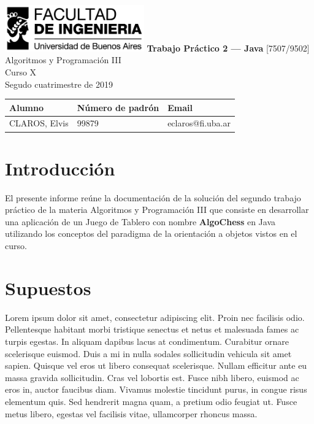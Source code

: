 \documentclass[titlepage,a4paper]{article}
\begin{document}
\begin{titlepage} %
	\hfill\includegraphics[width=6cm]{logofiuba.jpg}
    \centering
    \vfill
    \Huge \textbf{Trabajo Práctico 2 — Java}
    \vskip2cm
    \Large [7507/9502] Algoritmos y Programación III\\
    Curso X \\ %
    Segudo cuatrimestre de 2019 
    \vfill
    \begin{tabular}{ | l | l | l | } %
      \hline \hline
      Alumno & Número de padrón & Email\\ \hline \hline
      CLAROS, Elvis & 99879 & eclaros@fi.uba.ar\\ \hline
    
  	\end{tabular}
    \vfill
    \vfill
\end{titlepage}

\tableofcontents %
\newpage

\section{Introducción}\label{sec:intro}
El presente informe reúne la documentación de la solución del segundo trabajo práctico de la materia Algoritmos y Programación III que consiste en desarrollar una aplicación de un Juego de Tablero con nombre \textbf{AlgoChess} en Java utilizando los conceptos del paradigma de la orientación a objetos vistos en el curso.

\section{Supuestos}\label{sec:supuestos}

Lorem ipsum dolor sit amet, consectetur adipiscing elit. Proin nec facilisis odio. Pellentesque habitant morbi tristique senectus et netus et malesuada fames ac turpis egestas. In aliquam dapibus lacus at condimentum. Curabitur ornare scelerisque euismod. Duis a mi in nulla sodales sollicitudin vehicula sit amet sapien. Quisque vel eros ut libero consequat scelerisque. Nullam efficitur ante eu massa gravida sollicitudin. Cras vel lobortis est. Fusce nibh libero, euismod ac eros in, auctor faucibus diam. Vivamus molestie tincidunt purus, in congue risus elementum quis. Sed hendrerit magna quam, a pretium odio feugiat ut. Fusce metus libero, egestas vel facilisis vitae, ullamcorper rhoncus massa.
\end{document}

